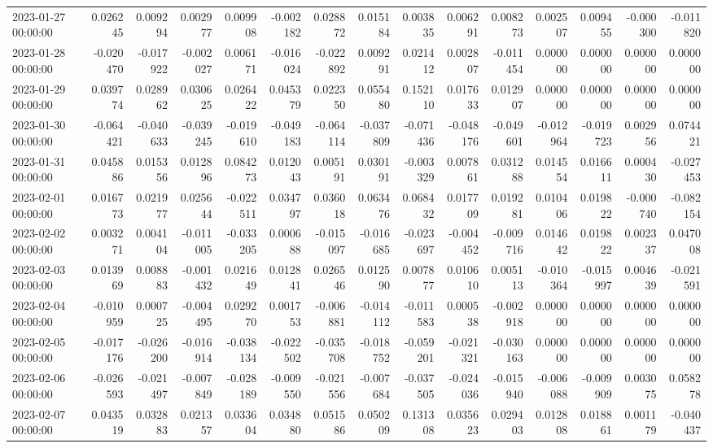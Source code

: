 \begin{tabular}{lrrrrrrrrrrrrrr}
2023-01-27 00:00:00 & 0.026245 & 0.009294 & 0.002977 & 0.009908 & -0.002182 & 0.028872 & 0.015184 & 0.003835 & 0.006291 & 0.008273 & 0.002507 & 0.009455 & -0.000300 & -0.011820 \\
2023-01-28 00:00:00 & -0.020470 & -0.017922 & -0.002027 & 0.006171 & -0.016024 & -0.022892 & 0.009291 & 0.021412 & 0.002807 & -0.011454 & 0.000000 & 0.000000 & 0.000000 & 0.000000 \\
2023-01-29 00:00:00 & 0.039774 & 0.028962 & 0.030625 & 0.026422 & 0.045379 & 0.022350 & 0.055480 & 0.152110 & 0.017633 & 0.012907 & 0.000000 & 0.000000 & 0.000000 & 0.000000 \\
2023-01-30 00:00:00 & -0.064421 & -0.040633 & -0.039245 & -0.019610 & -0.049183 & -0.064114 & -0.037809 & -0.071436 & -0.048176 & -0.049601 & -0.012964 & -0.019723 & 0.002956 & 0.074421 \\
2023-01-31 00:00:00 & 0.045886 & 0.015356 & 0.012896 & 0.084273 & 0.012043 & 0.005191 & 0.030191 & -0.003329 & 0.007861 & 0.031288 & 0.014554 & 0.016611 & 0.000430 & -0.027453 \\
2023-02-01 00:00:00 & 0.016773 & 0.021977 & 0.025644 & -0.022511 & 0.034797 & 0.036018 & 0.063476 & 0.068432 & 0.017709 & 0.019281 & 0.010406 & 0.019822 & -0.000740 & -0.082154 \\
2023-02-02 00:00:00 & 0.003271 & 0.004104 & -0.011005 & -0.033205 & 0.000688 & -0.015097 & -0.016685 & -0.023697 & -0.004452 & -0.009716 & 0.014642 & 0.019822 & 0.002337 & 0.047008 \\
2023-02-03 00:00:00 & 0.013969 & 0.008883 & -0.001432 & 0.021649 & 0.012841 & 0.026546 & 0.012590 & 0.007877 & 0.010610 & 0.005113 & -0.010364 & -0.015997 & 0.004639 & -0.021591 \\
2023-02-04 00:00:00 & -0.010959 & 0.000725 & -0.004495 & 0.029270 & 0.001753 & -0.006881 & -0.014112 & -0.011583 & 0.000538 & -0.002918 & 0.000000 & 0.000000 & 0.000000 & 0.000000 \\
2023-02-05 00:00:00 & -0.017176 & -0.026200 & -0.016914 & -0.038134 & -0.022502 & -0.035708 & -0.018752 & -0.059201 & -0.021321 & -0.030163 & 0.000000 & 0.000000 & 0.000000 & 0.000000 \\
2023-02-06 00:00:00 & -0.026593 & -0.021497 & -0.007849 & -0.028189 & -0.009550 & -0.021556 & -0.007684 & -0.037505 & -0.024036 & -0.015940 & -0.006088 & -0.009909 & 0.003075 & 0.058278 \\
2023-02-07 00:00:00 & 0.043519 & 0.032883 & 0.021357 & 0.033604 & 0.034880 & 0.051586 & 0.050209 & 0.131308 & 0.035623 & 0.029403 & 0.012808 & 0.018861 & 0.001179 & -0.040437 \\

\end{tabular}

